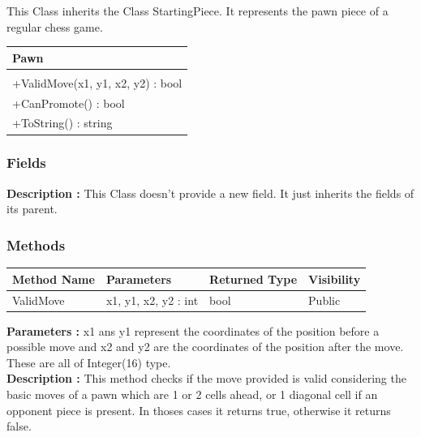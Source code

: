 \documentclass[12pt]{article}
\begin{document}
This Class inherits the Class StartingPiece. It represents the pawn 
piece of a regular chess game.
\begin{table}[H]
    \begin{tabular}{|l|}
    \hline
    \cellcolor[HTML]{C0C0C0}\textbf{Pawn} \\ \hline
    \cellcolor[HTML]{EFEFEF}                    \\ \hline
    +ValidMove(x1, y1, x2, y2) : bool           \\ \hline
    +CanPromote() : bool                        \\ \hline
    +ToString() : string                        \\ \hline
    \end{tabular}
\end{table}

\subsubsection{Fields}

\textbf{Description :} This Class doesn't provide a new field. It just
inherits the fields of its parent.

\subsubsection{Methods}

\begin{table}[H]
    \begin{tabular}{|l|l|l|l|}
    \hline
    \rowcolor[HTML]{EFEFEF} 
    \cellcolor[HTML]{EFEFEF}\textbf{Method Name} & \textbf{Parameters}  & \textbf{Returned Type} & \textbf{Visibility} \\ \hline
    ValidMove                          & x1, y1, x2, y2 : int & bool                   & Public              \\ \hline
    \end{tabular}
\end{table}

\textbf{Parameters :} x1 ans y1 represent the coordinates of the position before a possible move
and x2 and y2 are the coordinates of the position after the move. These are all of Integer(16) type.
\\
\textbf{Description :} This method checks
if the move provided is valid considering the basic moves of a pawn which
are 1 or 2 cells ahead, or 1 diagonal cell if an opponent piece is
present. In thoses cases it returns true, otherwise it returns false. 
\end{document}
